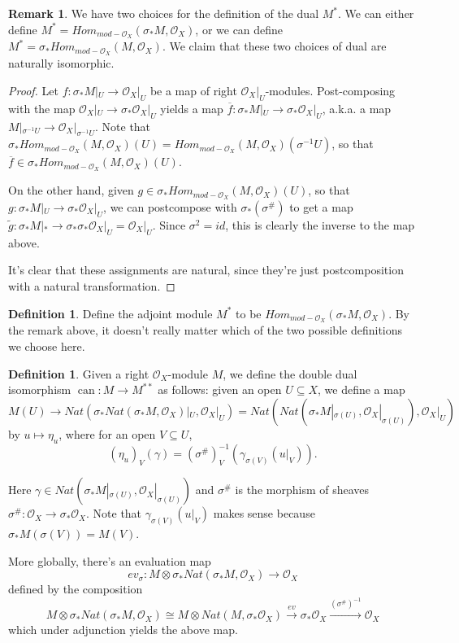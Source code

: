 \documentclass[draftthesis,tocnosub,noragright,centerchapter,10pt]{uiucthesis2009}
\newcommand{\mc}{\mathcal}
\DeclareMathOperator{\can}{can}
\theoremstyle{plain}
\theoremstyle{definition}
\newtheorem{definition}[lemma]{Definition}
\newtheorem{remark}[lemma]{Remark}
\begin{document}
\begin{remark}
We have two choices for the definition of the dual $M^*$. We can
either define $M^* = Hom_{mod-\mc O_X}(\sigma_*M,\mc O_X)$, or we can
define $M^* = \sigma_*Hom_{mod-\mc O_X}(M,\mc O_X)$. We claim that
these two choices of dual are naturally isomorphic. 
\end{remark}



\begin{proof}
Let $f : \sigma_*M|_U \rightarrow \mc O_X|_U$ be a map of right $\mc
O_X|_U$-modules. Post-composing with the map $\mc O_X|_U \rightarrow
\sigma_* \mc O_X|_U$ yields a map $\overline f : \sigma_*M|_U
\rightarrow \sigma_*\mc O_X|_U$, a.k.a. a map $M|_{\sigma^{-1}U}
\rightarrow \mc O_X|_{\sigma^{-1}U}$. Note that $\sigma_*Hom_{mod-\mc
  O_X}(M,\mc O_X)(U) = Hom_{mod-\mc
  O_X}(M,\mc O_X)(\sigma^{-1}U)$, so that $\overline f \in \sigma_*Hom_{mod-\mc
  O_X}(M,\mc O_X)(U)$.

On the other hand, given $g \in \sigma_*Hom_{mod-\mc O_X}(M,\mc
O_X)(U)$, so that $g : \sigma_*M|_U
\rightarrow \sigma_*\mc O_X|_U$, we can postcompose with
$\sigma_*(\sigma^\#)$ to get a map $\widetilde g : \sigma_*M|_*
\rightarrow \sigma_*\sigma_*\mc O_X|_U = \mc O_X|_U$. Since $\sigma^2
= id$, this is clearly the inverse to the map above. 

It's clear that these assignments are natural, since they're just
postcomposition with a natural transformation. 
\end{proof}

\begin{definition}
Define the adjoint module $M^*$ to be $Hom_{mod-\mc O_X}(\sigma_*M,\mc
O_X)$. By the remark above, it doesn't really matter which of the two
possible definitions we choose here. 
\end{definition}


\begin{definition}
Given a right $\mc O_X$-module $M$, we define the double dual
isomorphism $\can : M \rightarrow M^{**}$ as follows: given an open $U
\subseteq X$, we define a map
\[
M(U) \rightarrow Nat(\sigma_* Nat(\sigma_* M,\mc O_X)|_U, \mc O_X|_U)
= Nat(Nat(\sigma_* M|_{\sigma(U)}, \mc O_X|_{\sigma(U)}),\mc O_X|_U)
\]
by $u \mapsto \eta_u$, where for an open $V \subseteq U$,
\[
(\eta_u)_V(\gamma) = (\sigma^\#)_{V}^{-1}(\gamma_{\sigma(V)}(u|_V)).
\]

Here $\gamma \in Nat(\sigma_* M|_{\sigma(U)}, \mc
O_X|_{\sigma(U)})$ and $\sigma^\#$ is the morphism of sheaves
$\sigma^\# : \mc O_X \rightarrow \sigma_* \mc O_X$. Note that $\gamma_{\sigma(V)}(u|_V)$ makes sense
because $\sigma_*M(\sigma(V)) = M(V)$.

More globally, there's an evaluation map
\[
ev_\sigma : M \otimes \sigma_*Nat(\sigma_*M,\mc O_X) \rightarrow \mc O_X
\]
defined by the composition
\[
M \otimes \sigma_*Nat(\sigma_*M,\mc O_X) \cong M \otimes
Nat(M,\sigma_*\mc O_X) \xrightarrow{ ev} \sigma_* \mc O_X
\xrightarrow{(\sigma^\#)^{-1}} \mc O_X
\]
which under adjunction yields the above map. 
\end{definition}
\end{document}
